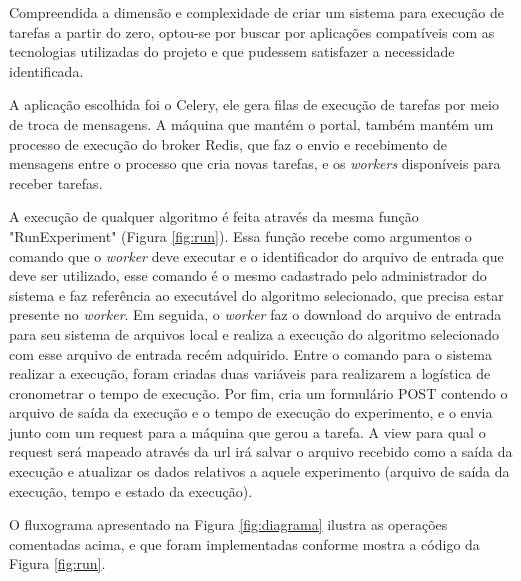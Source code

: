 \documentclass[tg]{mdtufsm}
\begin{document}
Compreendida a dimensão e complexidade de criar um sistema para execução de tarefas a partir do zero, optou-se por buscar por aplicações compatíveis com as tecnologias utilizadas do projeto e que pudessem satisfazer a necessidade identificada.

A aplicação escolhida foi o Celery, ele gera filas de execução de tarefas por meio de troca de mensagens. A máquina que mantém o portal, também mantém um processo de execução do broker Redis, que faz o envio e recebimento de mensagens entre o processo que cria novas tarefas, e os \emph{workers} disponíveis para receber tarefas.

A execução de qualquer algoritmo é feita através da mesma função "RunExperiment" (Figura \ref{fig:run}). Essa função recebe como argumentos o comando que o \emph{worker} deve executar e o identificador do arquivo de entrada que deve ser utilizado, esse comando é o mesmo cadastrado pelo administrador do sistema e faz referência ao executável do algoritmo selecionado, que precisa estar presente no \emph{worker}. Em seguida, o \emph{worker} faz o download do arquivo de entrada para seu sistema de arquivos local e realiza a execução do algoritmo selecionado com esse arquivo de entrada recém adquirido. Entre o comando para o sistema realizar a execução, foram criadas duas variáveis para realizarem a logística de cronometrar o tempo de execução. Por fim, cria um formulário POST contendo o arquivo de saída da execução e o tempo de execução do experimento, e o envia junto com um request para a máquina que gerou a tarefa. A view para qual o request será mapeado através da url irá salvar o arquivo recebido como a saída da execução e atualizar os dados relativos a aquele experimento (arquivo de saída da execução, tempo e estado da execução).

O fluxograma apresentado na Figura \ref{fig:diagrama} ilustra as operações comentadas acima, e que foram implementadas conforme mostra a código da Figura \ref{fig:run}.
\end{document}
